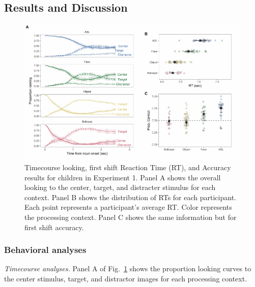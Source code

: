 \documentclass[english,floatsintext,man]{apa6}
\theoremstyle{definition}
\theoremstyle{definition}
\theoremstyle{definition}
\theoremstyle{remark}
\begin{document}
\hypertarget{results-and-discussion}{%
\subsection{Results and Discussion}\label{results-and-discussion}}

\begin{figure}[H]

{\centering \includegraphics[width=0.9\linewidth]{figs/speed-acc-trio-plot-1} 

}

\caption{Timecourse looking, first shift Reaction Time (RT), and Accuracy results for children in Experiment 1. Panel A shows the overall looking to the center, target, and distracter stimulus for each context. Panel B shows the distribution of RTs for each participant. Each point represents a participant's average RT. Color represents the processing context. Panel C shows the same information but for first shift accuracy.}\label{fig:speed-acc-trio-plot}
\end{figure}

\hypertarget{behavioral-analyses}{%
\subsubsection{Behavioral analyses}\label{behavioral-analyses}}

\emph{Timecourse analyses.} Panel A of
Fig.~\ref{fig:speed-acc-trio-plot} shows the proportion looking curves
to the center stimulus, target, and distractor images for each
processing context.
\end{document}

